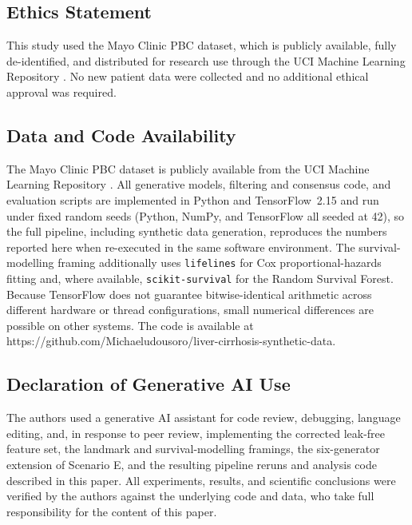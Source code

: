 \documentclass[journal]{IEEEtran}
\begin{document}
\subsection*{Ethics Statement}
This study used the Mayo Clinic PBC dataset, which is publicly available, fully de-identified, and distributed for research use through the UCI Machine Learning Repository \cite{ucipbc}. No new patient data were collected and no additional ethical approval was required.

\subsection*{Data and Code Availability}
The Mayo Clinic PBC dataset is publicly available from the UCI Machine Learning Repository \cite{ucipbc}. All generative models, filtering and consensus code, and evaluation scripts are implemented in Python and TensorFlow~2.15 and run under fixed random seeds (Python, NumPy, and TensorFlow all seeded at 42), so the full pipeline, including synthetic data generation, reproduces the numbers reported here when re-executed in the same software environment. The survival-modelling framing additionally uses \texttt{lifelines} for Cox proportional-hazards fitting and, where available, \texttt{scikit-survival} for the Random Survival Forest. Because TensorFlow does not guarantee bitwise-identical arithmetic across different hardware or thread configurations, small numerical differences are possible on other systems. The code is available at https://github.com/Michaeludousoro/liver-cirrhosis-synthetic-data.

\subsection*{Declaration of Generative AI Use}
The authors used a generative AI assistant for code review, debugging, language editing, and, in response to peer review, implementing the corrected leak-free feature set, the landmark and survival-modelling framings, the six-generator extension of Scenario E, and the resulting pipeline reruns and analysis code described in this paper. All experiments, results, and scientific conclusions were verified by the authors against the underlying code and data, who take full responsibility for the content of this paper.
\end{document}
